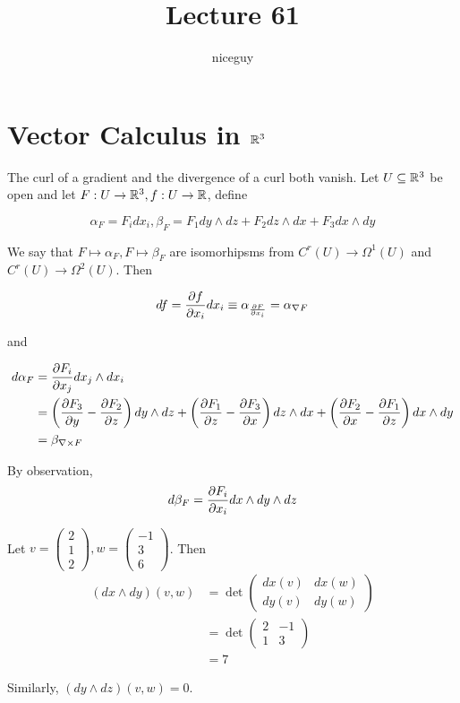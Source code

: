 \documentclass[12pt]{article}
\title{Lecture 61}
\author{niceguy}
\begin{document}
\maketitle

\section{Vector Calculus in $\mathbb{R}^3$}

The curl of a gradient and the divergence of a curl both vanish. Let $U \subseteq \mathbb{R}^3$ be open and let $F: U \rightarrow \mathbb{R}^3, f:U \rightarrow \mathbb{R}$, define

$$\alpha_F = F_idx_i, \beta_F = F_1 dy \wedge dz + F_2 dz \wedge dx + F_3 dx \wedge dy$$

We say that $F \mapsto \alpha_F, F \mapsto \beta_F$ are isomorhipsms from $C^r(U) \rightarrow \Omega^1(U)$ and $C^r(U) \rightarrow \Omega^2(U)$. Then

$$df = \frac{\partial f}{\partial x_i}dx_i \equiv \alpha_{\frac{\partial F}{\partial x_i}} = \alpha_{\nabla F}$$

and

\begin{align*}
    d\alpha_F &= \frac{\partial F_i}{\partial x_j} dx_j \wedge dx_i \\
              &= \left(\frac{\partial F_3}{\partial y} - \frac{\partial F_2}{\partial z}\right) dy \wedge dz + \left(\frac{\partial F_1}{\partial z} - \frac{\partial F_3}{\partial x}\right) dz \wedge dx + \left(\frac{\partial F_2}{\partial x} - \frac{\partial F_1}{\partial z}\right) dx \wedge dy \\
              &= \beta_{\nabla \times F}
\end{align*}

By observation,
$$d\beta_F = \frac{\partial F_i}{\partial x_i}dx \wedge dy \wedge dz$$

\begin{ex}
    Let $v = \begin{pmatrix} 2 \\ 1 \\ 2\end{pmatrix}, w = \begin{pmatrix} -1 \\ 3 \\ 6\end{pmatrix}$. Then
    \begin{align*}
        (dx \wedge dy)(v, w) &= \det\begin{pmatrix} dx(v) & dx(w) \\ dy(v) & dy(w)\end{pmatrix} \\
                             &= \det\begin{pmatrix} 2 & -1 \\ 1 & 3\end{pmatrix} \\
                             &= 7
    \end{align*}
\end{ex}

Similarly, $(dy \wedge dz)(v, w) = 0$.
\end{document}
